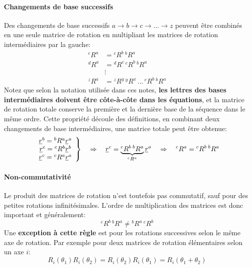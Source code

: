 \paragraph{Changements de base successifs} 

Des changements de base successifs $a \rightarrow b \rightarrow c \rightarrow ... \rightarrow z$  peuvent être combinés en une seule matrice de rotation en multipliant les matrices de rotation intermédiaires par la gauche:
\begin{align}
{}^cR^a &=  {}^cR^b \, {}^bR^a \\
{}^dR^a &=  {}^dR^c \, {}^cR^b \, {}^bR^a \\
& \vdots \\
{}^zR^a &=  {}^zR^y \, {}^yR^x \, \hdots \, {}^cR^b \, {}^bR^a 
\end{align}
Notez que selon la notation utilisée dans ces notes, \textbf{les lettres des bases intermédiaires doivent être côte-à-côte dans les équations}, et la matrice de rotation totale conserve la première et la dernière base de la séquence dans le même ordre. Cette propriété découle des définitions, en combinant deux changements de base intermédiaires, une matrice totale peut être obtenue: 
\begin{align}
\left. \begin{array}{c}
\underline{r}^b = {}^bR^a \underline{r}^a \\  \underline{r}^c = {}^cR^b \underline{r}^b \\ \underline{r}^c = {}^cR^a \underline{r}^a 
\end{array} \right\} \quad \Rightarrow \quad \underline{r}^c = \underbrace{{}^cR^b \,  {}^bR^a}_{ {}^cR^a } \underline{r}^a \quad \Rightarrow \quad {}^cR^a  = {}^cR^b \,  {}^bR^a 
\end{align}

\paragraph{Non-commutativité}

Le produit des matrices de rotation n'est toutefois pas commutatif, sauf pour des petites rotations infinitésimales. L'ordre de multiplication des matrices est donc important et généralement:
\begin{equation}
^cR^b \, ^bR^a \ne {}^bR^a \, ^cR^b
\end{equation} 
Une \textbf{exception à cette règle} est pour les rotations successives selon le même axe de rotation. Par exemple pour deux matrices de rotation élémentaires selon un axe $i$:
\begin{equation}
R_i( \theta_1 ) R_i( \theta_2 )  = R_i( \theta_2 ) R_i( \theta_1 ) = R_i( \theta_1 + \theta_2 )
\end{equation} 



